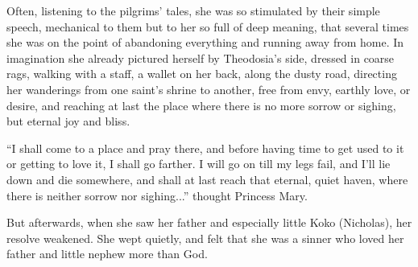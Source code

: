 Often, listening to the pilgrims' tales, she was so stimulated by
their simple speech, mechanical to them but to her so full of
deep meaning, that several times she was on the point of
abandoning everything and running away from home. In imagination
she already pictured herself by Theodosia's side, dressed in
coarse rags, walking with a staff, a wallet on her back, along
the dusty road, directing her wanderings from one saint's shrine
to another, free from envy, earthly love, or desire, and reaching
at last the place where there is no more sorrow or sighing, but
eternal joy and bliss.

``I shall come to a place and pray there, and before having time
to get used to it or getting to love it, I shall go farther. I
will go on till my legs fail, and I'll lie down and die
somewhere, and shall at last reach that eternal, quiet haven,
where there is neither sorrow nor sighing...'' thought Princess
Mary.

But afterwards, when she saw her father and especially little
Koko (Nicholas), her resolve weakened. She wept quietly, and felt
that she was a sinner who loved her father and little nephew more
than God.